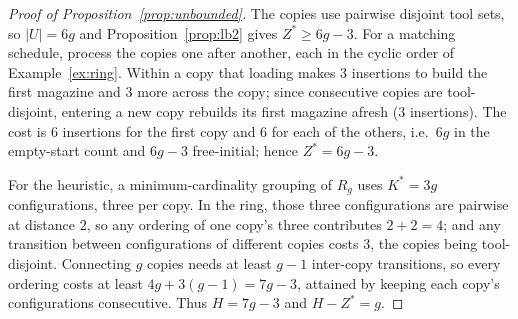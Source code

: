 \documentclass[11pt,a4paper]{article}
\theoremstyle{plain}
\theoremstyle{definition}
\theoremstyle{remark}
\newcommand{\U}{U}
\newcommand{\Kst}{K^{\ast}}
\newcommand{\Zst}{Z^{\ast}}
\begin{document}
\begin{proof}[Proof of Proposition~\ref{prop:unbounded}]
The copies use pairwise disjoint tool sets, so $\lvert\U\rvert=6g$ and
Proposition~\ref{prop:lb2} gives $\Zst\ge6g-3$. For a matching schedule, process the
copies one after another, each in the cyclic order of Example~\ref{ex:ring}. Within a
copy that loading makes $3$ insertions to build the first magazine and $3$ more
across the copy; since consecutive copies are tool-disjoint, entering a new copy
rebuilds its first magazine afresh ($3$ insertions). The cost is $6$ insertions for
the first copy and $6$ for each of the others, i.e.\ $6g$ in the empty-start count
and $6g-3$ free-initial; hence $\Zst=6g-3$.

For the heuristic, a minimum-cardinality grouping of $R_g$ uses $\Kst=3g$
configurations, three per copy. In the ring, those three configurations are pairwise
at distance $2$, so any ordering of one copy's three contributes $2+2=4$; and any
transition between configurations of different copies costs $3$, the copies being
tool-disjoint. Connecting $g$ copies needs at least $g-1$ inter-copy transitions, so
every ordering costs at least $4g+3(g-1)=7g-3$, attained by keeping each copy's
configurations consecutive. Thus $H=7g-3$ and $H-\Zst=g$.
\end{proof}
\end{document}
